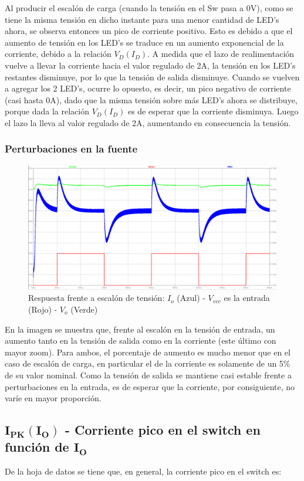 \documentclass[e4_tp2_main.tex]{subfiles}
\begin{document}
Al producir el escalón de carga (cuando la tensión en el Sw pasa a 0V), como se tiene la misma tensión en dicho instante para una menor cantidad de LED's ahora, se observa entonces un pico de corriente positivo. Esto es debido a que el aumento de tensión en los LED's se traduce en un aumento exponencial de la corriente, debido a la relación $V_D(I_D)$. A medida que el lazo de realimentación vuelve a llevar la corriente hacia el valor regulado de 2A, la tensión en los LED's restantes disminuye, por lo que la tensión de salida disminuye. Cuando se vuelven a agregar los 2 LED's, ocurre lo opuesto, es decir, un pico negativo de corriente (casi hasta 0A), dado que la misma tensión sobre más LED's ahora se distribuye, porque dada la relación $V_D(I_D)$ es de esperar que la corriente disminuya. Luego el lazo la lleva al valor regulado de 2A, aumentando en consecuencia la tensión.

\subsubsection*{Perturbaciones en la fuente}
\begin{figure}[H]
\centering
\includegraphics[width=0.7\linewidth]{Imagenes/Punto2/fuentevariable-I-V.PNG}
\caption{Respuesta frente a escalón de tensión: $I_o$ (Azul) - $V_{vcc}$ es la entrada (Rojo) - $V_o$ (Verde)}
\end{figure}

En la imagen se muestra que, frente al escalón en la tensión de entrada, un aumento tanto en la tensión de salida como en la corriente (este último con mayor zoom). Para ambos, el porcentaje de aumento es mucho menor que en el caso de escalón de carga, en particular el de la corriente es solamente de un 5\% de su valor nominal. Como la tensión de salida se mantiene casi estable frente a perturbaciones en la entrada, es de esperar que la corriente, por consiguiente, no varíe en mayor proporción.

\subsection*{$\mathbf{I_{PK}(I_O)}$ - Corriente pico en el switch en función de $\mathbf{I_O}$}
De la hoja de datos se tiene que, en general, la corriente pico en el switch es:
\end{document}
